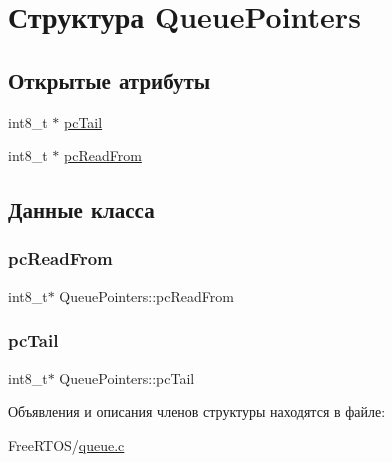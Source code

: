 \hypertarget{struct_queue_pointers}{}\section{Структура Queue\+Pointers}
\label{struct_queue_pointers}
\subsection*{Открытые атрибуты}
\begin{DoxyCompactItemize}
\item 
int8\+\_\+t $\ast$ \mbox{\hyperlink{struct_queue_pointers_acbbdc8eb47b348a824c7bced41512a38}{pc\+Tail}}
\item 
int8\+\_\+t $\ast$ \mbox{\hyperlink{struct_queue_pointers_af381d02bbe6bc4a77934c6fd97598913}{pc\+Read\+From}}
\end{DoxyCompactItemize}


\subsection{Данные класса}
\mbox{\label{struct_queue_pointers_af381d02bbe6bc4a77934c6fd97598913}} 
\subsubsection{\texorpdfstring{pcReadFrom}{pcReadFrom}}
{\footnotesize\ttfamily int8\+\_\+t$\ast$ Queue\+Pointers\+::pc\+Read\+From}

\mbox{\label{struct_queue_pointers_acbbdc8eb47b348a824c7bced41512a38}} 
\subsubsection{\texorpdfstring{pcTail}{pcTail}}
{\footnotesize\ttfamily int8\+\_\+t$\ast$ Queue\+Pointers\+::pc\+Tail}



Объявления и описания членов структуры находятся в файле\+:\begin{DoxyCompactItemize}
\item 
Free\+R\+T\+O\+S/\mbox{\hyperlink{queue_8c}{queue.\+c}}\end{DoxyCompactItemize}
